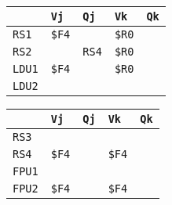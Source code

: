 \begin{enumerate}
    \begin{minipage}{0.45\textwidth}
        \centering
        \begin{tabular}{@{} l | l l l l @{}}
            \toprule
                & \texttt{Vj} & \texttt{Qj} & \texttt{Vk} & \texttt{Qk} \\
            \midrule
            \texttt{RS1} & \texttt{\$F4} & & \texttt{\$R0} & \\ [.3em]
            \texttt{RS2} & & \texttt{RS4} & \texttt{\$R0} & \\
            \cmidrule{1-5}
            \texttt{LDU1} & \texttt{\$F4} & & \texttt{\$R0} & \\ [.3em]
            \texttt{LDU2} & & & & \\
            \bottomrule
        \end{tabular}
    \end{minipage}
    \hfill
    \begin{minipage}{0.45\textwidth}
        \centering
        \begin{tabular}{@{} l | l l l l @{}}
            \toprule
            & \texttt{Vj} & \texttt{Qj} & \texttt{Vk} & \texttt{Qk} \\
            \midrule
            \texttt{RS3} & & & & \\ [.3em]
            \texttt{RS4} & \texttt{\$F4} & & \texttt{\$F4} & \\
            \cmidrule{1-5}
            \texttt{FPU1} & & & & \\ [.3em]
            \texttt{FPU2} & \texttt{\$F4} & & \texttt{\$F4} & \\
            \bottomrule
        \end{tabular}
    \end{minipage}


\end{enumerate}

